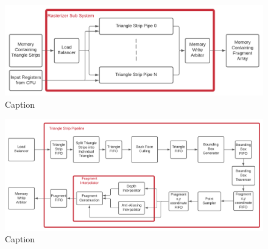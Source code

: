 \begin{landscape}
    \begin{figure}[ht]
        \centering
        \includegraphics[width=19cm]{functional_spec/images/RasterizerSS.png}
        \caption{Caption}
        \label{fig:RasterizerSS}
    \end{figure}
\end{landscape}
\begin{landscape}
    \begin{figure}[ht]
        \centering
        \includegraphics[width=20cm]{functional_spec/images/TriangleStripPipe.png}
        \caption{Caption}
        \label{fig:TriangleStripPipe}
    \end{figure}\end{landscape}

